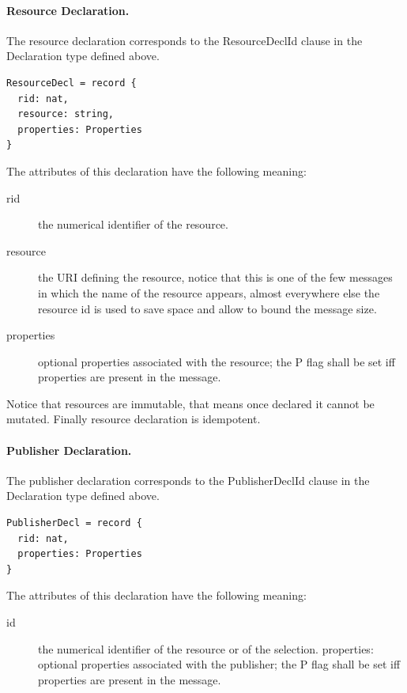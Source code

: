\documentclass[a4paper,oneside,article]{memoir}
\begin{document}
\paragraph{Resource Declaration.} The resource declaration corresponds to the ResourceDeclId clause
in the Declaration type defined above.
\begin{verbatim}
ResourceDecl = record {
  rid: nat,
  resource: string,
  properties: Properties
}  
\end{verbatim}

The attributes of this declaration have the following meaning:
\begin{description}
\item[rid] the numerical identifier of the resource.
\item[resource] the URI defining the resource, notice that this is one of the few messages in which
  the name of the resource appears, almost everywhere else the resource id is used to save space and
  allow to bound the message size.
\item[properties] optional properties associated with the resource; the P flag shall be set iff
  properties are present in the message.
\end{description}
Notice that resources are immutable, that means once declared it cannot be mutated. Finally resource
declaration is idempotent.

\paragraph{Publisher Declaration.} The publisher declaration corresponds to the PublisherDeclId
clause in the Declaration type defined above.
\begin{verbatim}
PublisherDecl = record {
  rid: nat,
  properties: Properties
}  
\end{verbatim}

The attributes of this declaration have the following meaning:
\begin{description}
\item[id] the numerical identifier of the resource or of the selection.  properties: optional
  properties associated with the publisher; the P flag shall be set iff properties are present in
  the message.
\end{description}
\end{document}
